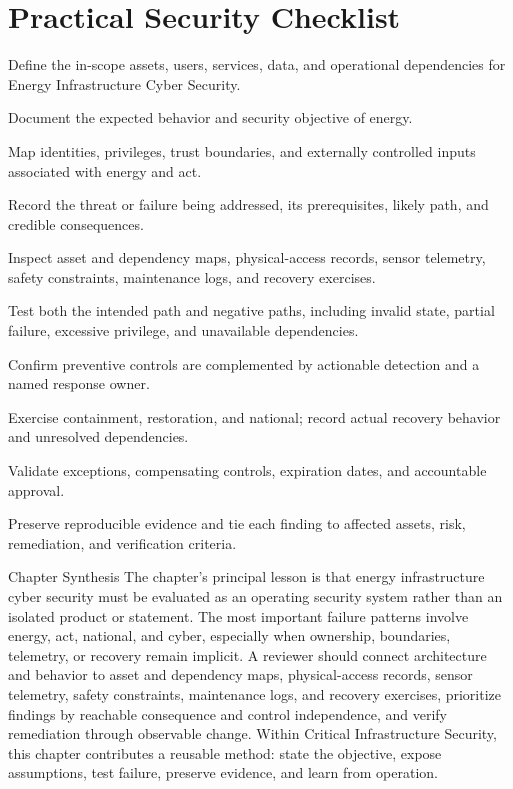 \documentclass[11pt,letterpaper]{article}
\begin{document}
\section*{Practical Security Checklist}
\begin{CornellChecklist}
\item Define the in-scope assets, users, services, data, and operational dependencies for Energy Infrastructure Cyber Security.
\item Document the expected behavior and security objective of energy.
\item Map identities, privileges, trust boundaries, and externally controlled inputs associated with energy and act.
\item Record the threat or failure being addressed, its prerequisites, likely path, and credible consequences.
\item Inspect asset and dependency maps, physical-access records, sensor telemetry, safety constraints, maintenance logs, and recovery exercises.
\item Test both the intended path and negative paths, including invalid state, partial failure, excessive privilege, and unavailable dependencies.
\item Confirm preventive controls are complemented by actionable detection and a named response owner.
\item Exercise containment, restoration, and national; record actual recovery behavior and unresolved dependencies.
\item Validate exceptions, compensating controls, expiration dates, and accountable approval.
\item Preserve reproducible evidence and tie each finding to affected assets, risk, remediation, and verification criteria.
\end{CornellChecklist}
\begin{CornellSummaryBox}{Chapter Synthesis}
The chapter's principal lesson is that energy infrastructure cyber security must be evaluated as an operating security system rather than an isolated product or statement. The most important failure patterns involve energy, act, national, and cyber, especially when ownership, boundaries, telemetry, or recovery remain implicit. A reviewer should connect architecture and behavior to asset and dependency maps, physical-access records, sensor telemetry, safety constraints, maintenance logs, and recovery exercises, prioritize findings by reachable consequence and control independence, and verify remediation through observable change. Within Critical Infrastructure Security, this chapter contributes a reusable method: state the objective, expose assumptions, test failure, preserve evidence, and learn from operation.
\end{CornellSummaryBox}
\end{document}
